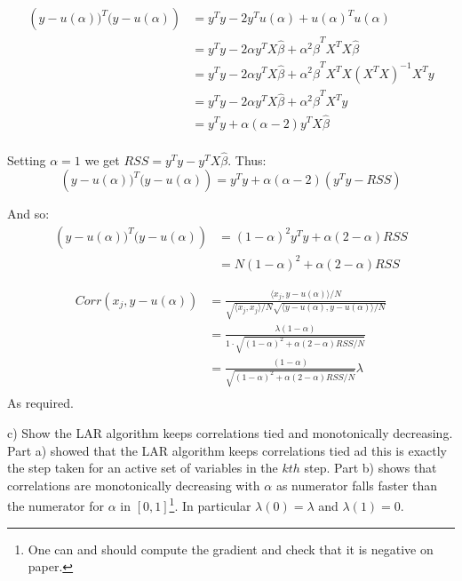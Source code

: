 \begin{align*}
    \left(y - u(\alpha))^T (y - u(\alpha)\right) &= 
    y^T y - 2 y^T u(\alpha) + u(\alpha)^T u(\alpha)\\
    &= y^T y - 2\alpha y^T X\hat{\beta} + \alpha^2 \hat{\beta}^T X^T X\hat{\beta}\\
    &= y^T y - 2\alpha y^T X\hat{\beta} + \alpha^2 \hat{\beta}^T X^T X \left(X^TX\right)^{-1} X^T y\\
    &= y^T y - 2\alpha y^T X\hat{\beta} + \alpha^2 \hat{\beta}^T X^T y\\
    &= y^T y + \alpha( \alpha - 2) y^T X\hat{\beta}\\
\end{align*}

Setting $\alpha = 1$ we get $RSS = y^T y - y^T X\hat{\beta}$.
Thus: $$\left(y - u(\alpha))^T (y - u(\alpha)\right) =  y^T y + \alpha( \alpha - 2) (y^T y - RSS)$$

And so:
\begin{align*}
\left(y - u(\alpha))^T (y - u(\alpha)\right) &=  (1 - \alpha)^2 y^T y + \alpha(2 - \alpha) RSS \\
&=  N (1 - \alpha)^2  + \alpha(2 - \alpha) RSS 
\end{align*} 

\begin{align*}
    Corr\left(x_j, y - u(\alpha)\right) &= \frac{\langle x_j, y - u(\alpha)\rangle / N}{\sqrt{\langle x_j, x_j \rangle / N}{\sqrt{\langle y - u(\alpha), y - u(\alpha) \rangle / N}}}\\
    &= \frac{\lambda (1 - \alpha)}{1\cdot{\sqrt{(1 - \alpha)^2  + \alpha(2 - \alpha) RSS / N} }}\\
    &= \frac{(1 - \alpha)}{{\sqrt{(1 - \alpha)^2  + \alpha(2 - \alpha) RSS / N} }} \lambda \\
\end{align*}
As required.

c) Show the LAR algorithm keeps correlations tied and monotonically decreasing.\\

Part a) showed that the LAR algorithm keeps correlations tied ad this is exactly the step taken for an active set of variables in the $kth$ step.
Part b) shows that correlations are monotonically decreasing with $\alpha$ as numerator falls  faster than the numerator for $\alpha$ in $[0,1]$\footnote{One can and should compute the gradient and check that it is negative on paper.}. In particular $\lambda(0) = \lambda$ and $\lambda(1) = 0$.

